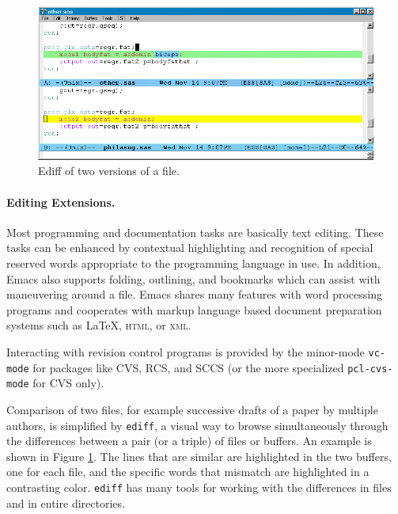 \documentclass{article}
\newif\ifdraft
\newcommand{\stexttt}[1]{{\small\texttt{#1}}}
\newcommand{\emptyfig}{
\hspace*{42pt}\rule{324pt}{.25pt}\\
\hspace*{42pt}\rule{.25pt}{10pc}
\rule{316pt}{.25pt}
\rule{.25pt}{10pc}}
\begin{document}
\begin{figure}[htbp] 
 \centering
\ifdraft
  \emptyfig
\else
  \includegraphics[angle=270,width=\textwidth]{ediff-sas}
\fi
  \caption{Ediff of two versions of a file.}
  \label{f.ediff}
\end{figure}

\paragraph{Editing Extensions.}
Most programming and documentation tasks are basically text editing.
These tasks can be enhanced by %
contextual highlighting and recognition of special reserved words
appropriate to the programming language in use.  In addition, Emacs
also supports folding, outlining, and bookmarks which can assist with
maneuvering around a file.  Emacs shares many features with word
processing programs and cooperates with markup language based document
preparation systems such as \LaTeX, \textsc{html}, or \textsc{xml}.

Interacting with revision control programs is provided by the
minor-mode \stexttt{vc-mode} for packages like CVS, RCS, and SCCS (or
the more specialized \stexttt{pcl-cvs-mode} for CVS only).

Comparison of two files, for example successive drafts of a paper
by multiple authors, is simplified by \stexttt{ediff}, a visual 
way to browse simultaneously through
the differences between a pair (or a triple) of files or buffers.
An example is shown in Figure \ref{f.ediff}.  The lines that are similar
are highlighted in the two buffers, one for each file, and the specific
words that mismatch are highlighted in a contrasting color.
\stexttt{ediff} has many tools for working with the differences in
files and in entire directories.
\end{document}
